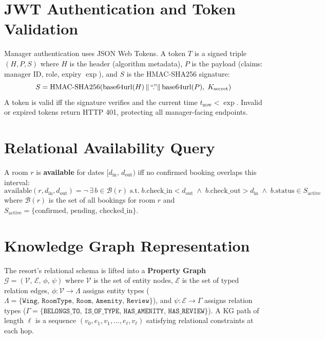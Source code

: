 \documentclass[11pt,a4paper]{report}
\begin{document}
\section{JWT Authentication and Token Validation}

Manager authentication uses JSON Web Tokens. A token $T$ is a signed triple $(H, P, S)$ where $H$ is the header (algorithm metadata), $P$ is the payload (claims: manager ID, role, expiry $\exp$), and $S$ is the HMAC-SHA256 signature:
\[
S = \text{HMAC-SHA256}(\text{base64url}(H) \,\|\, \text{``.''\!} \,\|\, \text{base64url}(P),\; K_{\text{secret}})
\]
A token is valid iff the signature verifies and the current time $t_{\text{now}} < \exp$. Invalid or expired tokens return HTTP 401, protecting all manager-facing endpoints.

\section{Relational Availability Query}

A room $r$ is \textbf{available} for dates $[d_{\text{in}},\, d_{\text{out}})$ iff no confirmed booking overlaps this interval:
\[
\text{available}(r, d_{\text{in}}, d_{\text{out}}) = \neg\, \exists\, b \in \mathcal{B}(r) \;\text{s.t.}\; b.\text{check\_in} < d_{\text{out}} \;\wedge\; b.\text{check\_out} > d_{\text{in}} \;\wedge\; b.\text{status} \in S_{\text{active}}
\]
where $\mathcal{B}(r)$ is the set of all bookings for room $r$ and $S_{\text{active}} = \{\text{confirmed},\, \text{pending},\, \text{checked\_in}\}$.

\section{Knowledge Graph Representation}

The resort's relational schema is lifted into a \textbf{Property Graph} $\mathcal{G} = (\mathcal{V},\, \mathcal{E},\, \phi,\, \psi)$ where $\mathcal{V}$ is the set of entity nodes, $\mathcal{E}$ is the set of typed relation edges, $\phi: \mathcal{V} \rightarrow \Lambda$ assigns entity types ($\Lambda = \{\texttt{Wing},\, \texttt{RoomType},\, \texttt{Room},\, \texttt{Amenity},\, \texttt{Review}\}$), and $\psi: \mathcal{E} \rightarrow \Gamma$ assigns relation types ($\Gamma = \{\texttt{BELONGS\_TO},\, \texttt{IS\_OF\_TYPE},\, \texttt{HAS\_AMENITY},\, \texttt{HAS\_REVIEW}\}$). A KG path of length $\ell$ is a sequence $(v_0, e_1, v_1, \ldots, e_\ell, v_\ell)$ satisfying relational constraints at each hop.
\end{document}
